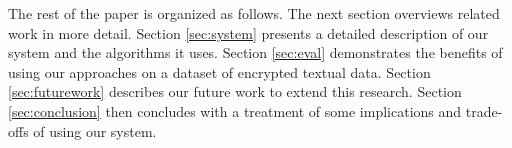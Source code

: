 The rest of the paper is organized as follows. The next section overviews
related work in more detail.
Section \ref{sec:system} presents a detailed description of our system and the 
algorithms it uses.
Section \ref{sec:eval} demonstrates the benefits of using our approaches
on a dataset of encrypted textual data. Section \ref{sec:futurework} describes
our future work to extend this research. Section \ref{sec:conclusion} then concludes
with a treatment of some implications and trade-offs of using our system.
